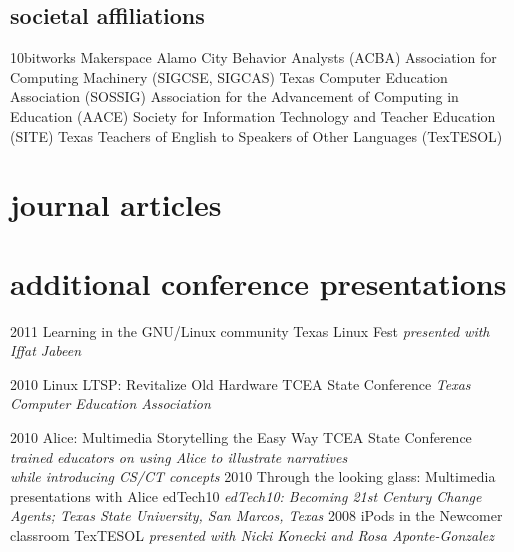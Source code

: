 \documentclass[hidelinks]{gnudon}
\begin{document}
\begin{aside}
  \section{{\color {orange} soc}ietal {\color {red} aff}iliations}
{\small{10bitworks Makerspace
    Alamo City Behavior Analysts (ACBA)
    Association for Computing Machinery (SIGCSE, SIGCAS) 
    Texas Computer Education Association (SOSSIG)
    Association for the Advancement of Computing in Education (AACE)
    Society for Information Technology and Teacher Education (SITE)
    Texas Teachers of English to Speakers of Other Languages (TexTESOL)}}
\end{aside}

\section{journal articles}

\begin{refsection}
  \nocite{*}
  \printbibliography[sorting=chronological, type=inproceedings, title={{\color {green}int}ernational peer-reviewed conference proceedings}, heading=subbibliography]
 \end{refsection}
\section{additional conference presentations}
\begin{entrylist}
 \entry
    {2011}
    {Learning in the GNU/Linux community}
    {Texas Linux Fest}
    {{\emph{\small{presented with Iffat Jabeen}}}}

   \entry
    {2010}
    {Linux LTSP: Revitalize Old Hardware}
    {TCEA State Conference}
    {{\emph{\small{Texas Computer Education Association}}}}

    \entry
     {2010}
     {Alice: Multimedia Storytelling the Easy Way}
     {TCEA State Conference}
      {{\emph{\small{trained educators on using Alice to illustrate narratives \\while introducing CS/CT concepts}}}}
     \entry
     {2010}
     {Through the looking glass: Multimedia presentations with Alice}
     {edTech10}
     {{\emph{\small{edTech10: Becoming 21st Century Change Agents; Texas State University, San Marcos, Texas}}}}
     \entry
    {2008}
    {iPods in the Newcomer classroom}
    {TexTESOL}
    {{\emph{\small{presented with Nicki Konecki and Rosa Aponte-Gonzalez}}}}    
\end{entrylist}
\end{document}
